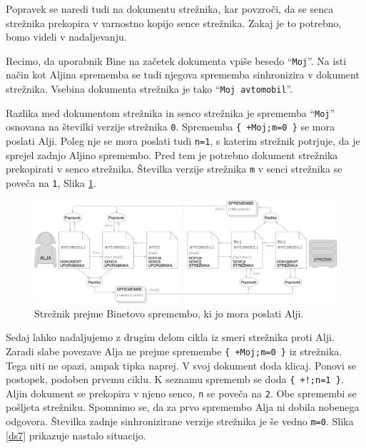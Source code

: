 \documentclass[a4paper, 12pt, twoside]{book}
\begin{document}
Popravek se naredi tudi na dokumentu strežnika, kar povzroči, da se senca strežnika prekopira v varnostno kopijo sence strežnika. Zakaj je to potrebno, bomo videli v nadaljevanju.

Recimo, da uporabnik Bine na začetek dokumenta vpiše besedo “{\tt Moj}”. Na isti način kot Aljina sprememba se tudi njegova sprememba sinhronizira v dokument strežnika. Vsebina dokumenta strežnika je tako “{\tt Moj avtomobil}”.

Razlika med dokumentom strežnika in senco strežnika je sprememba “{\tt Moj}” osnovana na številki verzije strežnika {\tt 0}. Sprememba {\tt \{ +Moj;m=0 \}} se mora poslati Alji. Poleg nje se mora poslati tudi {\tt n=1}, s katerim strežnik potrjuje, da je sprejel zadnjo Aljino spremembo. Pred tem je potrebno dokument strežnika prekopirati v senco strežnika. Številka verzije strežnika {\tt m} v senci strežnika se poveča na {\tt 1}, Slika \ref{ds6}.

\pagebreak

\begin{figure}[placement h]
\begin{center}
\includegraphics[width=16cm]{img/ds6.pdf}
\end{center}
\caption{Strežnik prejme Binetovo spremembo, ki jo mora poslati Alji.}
\label{ds6}
\end{figure}

Sedaj lahko nadaljujemo z drugim delom cikla iz smeri strežnika proti Alji. Zaradi slabe povezave Alja ne prejme spremembe {\tt \{ +Moj;m=0 \}} iz strežnika. Tega niti ne opazi, ampak tipka naprej. V svoj dokument doda klicaj. Ponovi se postopek, podoben prvemu ciklu. K seznamu sprememb se doda {\tt \{ +!;n=1 \}}. Aljin dokument se prekopira v njeno senco, {\tt n} se poveča na {\tt 2}. Obe spremembi se pošljeta strežniku. Spomnimo se, da za prvo spremembo Alja ni dobila nobenega odgovora. Številka zadnje sinhronizirane verzije strežnika je še vedno {\tt m=0}. Slika \ref{ds7} prikazuje nastalo situacijo.
\end{document}
